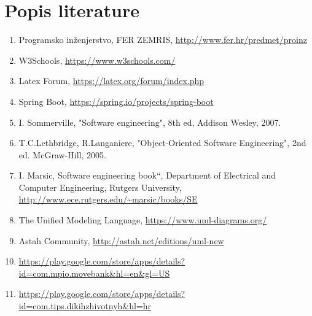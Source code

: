 \chapter*{Popis literature}
		
		\begin{enumerate}
			
			
			\item  Programsko inženjerstvo, FER ZEMRIS, \url{http://www.fer.hr/predmet/proinz}
			
			\item  W3Schools, \url{https://www.w3schools.com/}
			
			\item Latex Forum, \url{https://latex.org/forum/index.php}
			
			\item Spring Boot, \url{https://spring.io/projects/spring-boot}
			
			\item  I. Sommerville, "Software engineering", 8th ed, Addison Wesley, 2007.
			
			\item  T.C.Lethbridge, R.Langaniere, "Object-Oriented Software Engineering", 2nd ed. McGraw-Hill, 2005.
			
			\item  I. Marsic, Software engineering book``, Department of Electrical and Computer Engineering, Rutgers University, \url{http://www.ece.rutgers.edu/~marsic/books/SE}
			
			\item  The Unified Modeling Language, \url{https://www.uml-diagrams.org/}
			
			\item  Astah Community, \url{http://astah.net/editions/uml-new}
			
			\item  \url{https://play.google.com/store/apps/details?id=com.mpio.movebank&hl=en&gl=US}
			
			\item  \url{https://play.google.com/store/apps/details?id=com.tips.dikihzhivotnyh&hl=hr}
		\end{enumerate}
		
		 